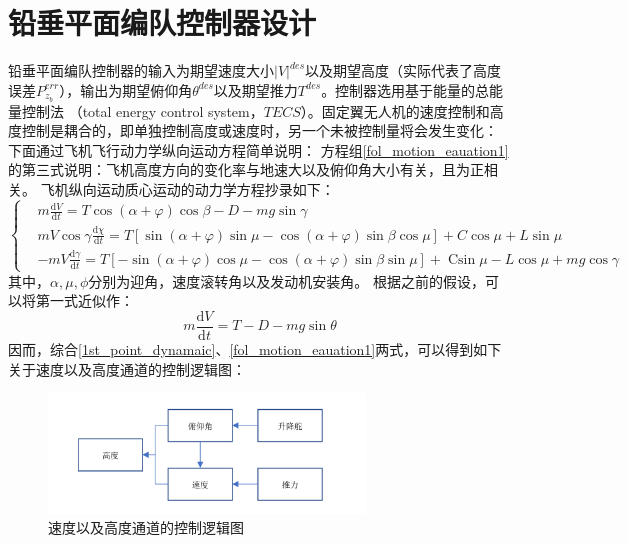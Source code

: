 \section{铅垂平面编队控制器设计}
铅垂平面编队控制器的输入为期望速度大小$|V|^{des}$以及期望高度（实际代表了高度误差$P_{z_b}^{err}$），输出为期望俯仰角$\theta^{des}$以及期望推力$T^{des}$。控制器选用基于能量的总能量控制法
（total energy control system，$TECS$）。固定翼无人机的速度控制和高度控制是耦合的，即单独控制高度或速度时，另一个未被控制量将会发生变化：
下面通过飞机飞行动力学纵向运动方程简单说明：
方程组\ref{fol_motion_eauation1}的第三式说明：飞机高度方向的变化率与地速大以及俯仰角大小有关，且为正相关。
飞机纵向运动质心运动的动力学方程抄录如下：
\begin{equation}
    \left\{
    \begin{aligned}
    &m \frac{\mathrm{d} V}{\mathrm{d} t}=T \cos (\alpha+\varphi) \cos \beta-D-m g \sin \gamma\\
    &m V \cos \gamma \frac{\mathrm{d} \chi}{\mathrm{d} t}=T[\sin (\alpha+\varphi) \sin \mu-\cos (\alpha+\varphi) \sin \beta \cos \mu]+C \cos \mu+L \sin \mu\\
    &-m V \frac{\mathrm{d} \gamma}{\mathrm{d} t}=T[-\sin (\alpha+\varphi) \cos \mu-\cos (\alpha+\varphi) \sin \beta \sin \mu]+\operatorname{Csin} \mu-L \cos \mu+m g \cos \gamma
    \end{aligned}
    \right .
    \label{point_dynamaic}
\end{equation}
其中，$\alpha,\mu,\phi$分别为迎角，速度滚转角以及发动机安装角。
根据之前的假设，可以将第一式近似作：
\begin{equation}
    m \frac{\mathrm{d} V}{\mathrm{d} t}=T-D-m g \sin \theta
    \label{1st_point_dynamaic}
\end{equation}
因而，综合\ref{1st_point_dynamaic}、\ref{fol_motion_eauation1}两式，可以得到如下关于速度以及高度通道的控制逻辑图：
\begin{figure}[H]
    \centering
    \includegraphics[width=0.75\textwidth]{figures/c3/relation_theta_thrust}
    \caption{速度以及高度通道的控制逻辑图}\label{fig:relation_theta_thrust}
\end{figure}
